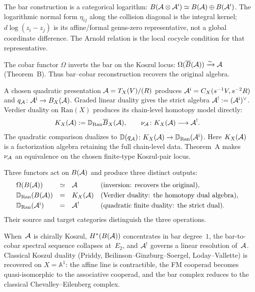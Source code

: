 The bar construction is a categorical logarithm:
$B(\mathcal{A}\otimes\mathcal{A}') \simeq B(\mathcal{A})\oplus B(\mathcal{A}')$.
The logarithmic normal form \(\eta_{ij}\) along the collision diagonal
is the integral kernel; \(d\log(z_i-z_j)\) is its affine/formal
genus-zero representative, not a global coordinate difference. The
Arnold relation is the local cocycle condition for that representative.

The cobar functor $\Omega$ inverts the bar on the Koszul locus:
$\Omega(\overline{B}(\mathcal{A}))\xrightarrow{\sim}\mathcal{A}$ (Theorem~B).
Thus bar--cobar reconstruction recovers the original algebra.

A chosen quadratic presentation $\mathcal{A}=T_X(V)/(R)$ produces
$\mathcal{A}^{\mathrm i}=C_X(s^{-1}V,s^{-2}R)$ and
$q_{\mathcal{A}}\colon\mathcal{A}^{\mathrm i}\to B_X(\mathcal{A})$.
Graded linear duality gives the strict algebra
$\mathcal{A}^!:=(\mathcal{A}^{\mathrm i})^\vee$. Verdier duality on
$\mathrm{Ran}(X)$ produces its chain-level homotopy model directly:
\begin{equation}\label{eq:pf1-verdier}
K_X(\mathcal{A}):=\mathbb D_{\mathrm{Ran}}\overline{B}_X(\mathcal{A}),
\qquad
\nu_{\mathcal{A}}\colon K_X(\mathcal{A})\longrightarrow\mathcal{A}^!.
\end{equation}
The quadratic comparison dualizes to
$\mathbb D(q_{\mathcal{A}})\colon K_X(\mathcal{A})\to
\mathbb D_{\mathrm{Ran}}(\mathcal{A}^{\mathrm i})$.
Here $K_X(\mathcal{A})$ is a factorization algebra retaining the full
chain-level data.  Theorem~A makes~$\nu_{\mathcal{A}}$ an equivalence on the
chosen finite-type Koszul-pair locus.

Three functors act on $B(\mathcal{A})$ and produce three distinct outputs:
\[
\begin{array}{lcll}
\Omega(B(\mathcal{A})) &\simeq& \mathcal{A}
 & \text{(inversion: recovers the original)},\\[3pt]
\mathbb D_{\mathrm{Ran}}(B(\mathcal{A}))
 &=& K_X(\mathcal{A})
 & \text{(Verdier duality: the homotopy dual algebra)},\\[3pt]
\mathbb D_{\mathrm{Ran}}(\mathcal{A}^{\mathrm i}) &=& \mathcal{A}^!
 & \text{(quadratic finite duality: the strict dual)}.
\end{array}
\]
Their source and target categories distinguish the three operations.

When~$\mathcal{A}$ is chirally Koszul, $H^*(B(\mathcal{A}))$ concentrates in bar
degree~$1$, the bar-to-cobar spectral sequence collapses at~$E_2$,
and $\mathcal{A}^!$ governs a linear resolution of~$\mathcal{A}$. Classical Koszul
duality (Priddy, Beilinson--Ginzburg--Soergel, Loday--Vallette) is
recovered on $X=\mathbb A^1$: the affine line is contractible, the
FM cooperad becomes quasi-isomorphic to the associative cooperad,
and the bar complex reduces to the classical Chevalley--Eilenberg
complex.


